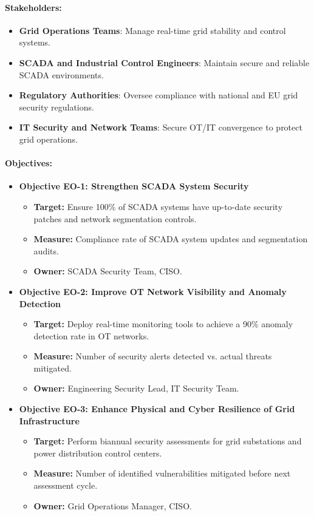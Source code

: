 \paragraph{Stakeholders:}
\begin{itemize}
      \item \textbf{Grid Operations Teams}: Manage real-time grid stability and control systems.
      \item \textbf{SCADA and Industrial Control Engineers}: Maintain secure and reliable SCADA environments.
      \item \textbf{Regulatory Authorities}: Oversee compliance with national and EU grid security regulations.
      \item \textbf{IT Security and Network Teams}: Secure OT/IT convergence to protect grid operations.
\end{itemize}

\paragraph{Objectives:}
\begin{itemize}
      \item \textbf{Objective EO-1: Strengthen SCADA System Security}
            \begin{itemize}
                  \item \textbf{Target:} Ensure 100\% of SCADA systems have up-to-date security patches and network segmentation controls.
                  \item \textbf{Measure:} Compliance rate of SCADA system updates and segmentation audits.
                  \item \textbf{Owner:} SCADA Security Team, \ac{CISO}.
            \end{itemize}
      \item \textbf{Objective EO-2: Improve OT Network Visibility and Anomaly Detection}
            \begin{itemize}
                  \item \textbf{Target:} Deploy real-time monitoring tools to achieve a 90\% anomaly detection rate in OT networks.
                  \item \textbf{Measure:} Number of security alerts detected vs. actual threats mitigated.
                  \item \textbf{Owner:} Engineering Security Lead, IT Security Team.
            \end{itemize}
      \item \textbf{Objective EO-3: Enhance Physical and Cyber Resilience of Grid Infrastructure}
            \begin{itemize}
                  \item \textbf{Target:} Perform biannual security assessments for grid substations and power distribution control centers.
                  \item \textbf{Measure:} Number of identified vulnerabilities mitigated before next assessment cycle.
                  \item \textbf{Owner:} Grid Operations Manager, \ac{CISO}.
            \end{itemize}
\end{itemize}


